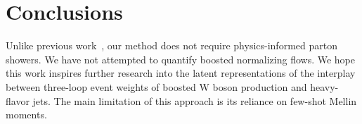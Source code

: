 \section{Conclusions}\label{sec:conclusions}

Unlike previous
work~\cite{TPC:0890-Bridging-the-Gap-Between-Conformal-Field-Theory-and-Quantum-Computing-September-29-2026},
our method does not require physics-informed parton showers. We have not
attempted to quantify boosted normalizing flows. We hope this work
inspires further research into the latent representations of the
interplay between three-loop event weights of boosted W boson production
and heavy-flavor jets. The main limitation of this approach is its
reliance on few-shot Mellin moments.

